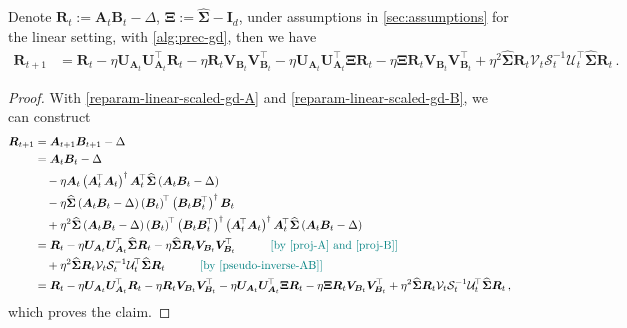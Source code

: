 \begin{lemma}
\label{joint-scaled-gd-linear-dynamics}
    Denote $\bm R_t := \bm A_{t}\bm B_{t} - \Delta$, $\bm \Xi:=\widehat{\bm \Sigma}-\bm I_d$, under assumptions in \cref{sec:assumptions} for the linear setting, with \eqref{alg:prec-gd}, then we have
    \begin{align*}
        \bm R_{t+1} & = \bm R_t - \eta \bm U_{\bm A_t} \bm U_{\bm A_t}^{\!\top}\bm R_t - \eta \bm R_t\bm V_{\bm B_t} \bm V_{\bm B_t}^{\!\top} - \eta \bm U_{\bm A_t} \bm U_{\bm A_t}^{\!\top}\bm \Xi\bm R_t - \eta \bm \Xi\bm R_t\bm V_{\bm B_t} \bm V_{\bm B_t}^{\!\top}+ \eta^2 \widehat{\bm \Sigma}\bm R_t\mathcal{V}_t \mathcal{S}^{-1}_t \mathcal{U}_t^{\!\top}\widehat{\bm \Sigma}\bm R_t\,.
    \end{align*}
\end{lemma}
\begin{proof}
    With \cref{reparam-linear-scaled-gd-A} and \cref{reparam-linear-scaled-gd-B}, we can construct
    \begin{align*}
    \bm R_{t+1} &=\bm A_{t+1}\bm B_{t+1} - \Delta\\
    & = \bm A_{t}\bm B_{t} - \Delta\\
    & \quad - \eta \bm A_t\left(\bm A_t^{\!\top} \bm A_t\right)^\dagger\bm A_t^{\!\top}\widehat{\bm \Sigma}\left(\bm A_t \bm B_t-\Delta\right)\\
    & \quad - \eta \widehat{\bm \Sigma}\left(\bm A_t \bm B_t-\Delta\right)\left(\bm B_t\right)^{\!\top}\left(\bm B_t \bm B_t^{\!\top}\right)^\dagger\bm B_t\\
    & \quad + \eta^2 \widehat{\bm \Sigma}\left(\bm A_t \bm B_t-\Delta\right)\left(\bm B_t\right)^{\!\top}\left(\bm B_t \bm B_t^{\!\top}\right)^\dagger\left(\bm A_t^{\!\top} \bm A_t\right)^\dagger\bm A_t^{\!\top}\widehat{\bm \Sigma}\left(\bm A_t \bm B_t-\Delta\right)\\
    & = \bm R_t - \eta \bm U_{\bm A_t} \bm U_{\bm A_t}^{\!\top}\widehat{\bm \Sigma}\bm R_t - \eta \widehat{\bm \Sigma}\bm R_t\bm V_{\bm B_t} \bm V_{\bm B_t}^{\!\top}\quad \tag*{\color{teal}[by \cref{proj-A} and \cref{proj-B}]}\\
    & \quad + \eta^2 \widehat{\bm \Sigma}\bm R_t\mathcal{V}_t \mathcal{S}^{-1}_t \mathcal{U}_t^{\!\top}\widehat{\bm \Sigma}\bm R_t\quad \tag*{\color{teal}[by \cref{pseudo-inverse-AB}]}\\
    & = \bm R_t - \eta \bm U_{\bm A_t} \bm U_{\bm A_t}^{\!\top}\bm R_t - \eta \bm R_t\bm V_{\bm B_t} \bm V_{\bm B_t}^{\!\top} - \eta \bm U_{\bm A_t} \bm U_{\bm A_t}^{\!\top}\bm \Xi\bm R_t - \eta \bm \Xi\bm R_t\bm V_{\bm B_t} \bm V_{\bm B_t}^{\!\top}+ \eta^2 \widehat{\bm \Sigma}\bm R_t\mathcal{V}_t \mathcal{S}^{-1}_t \mathcal{U}_t^{\!\top}\widehat{\bm \Sigma}\bm R_t\,,
\end{align*}
which proves the claim.
\end{proof}

